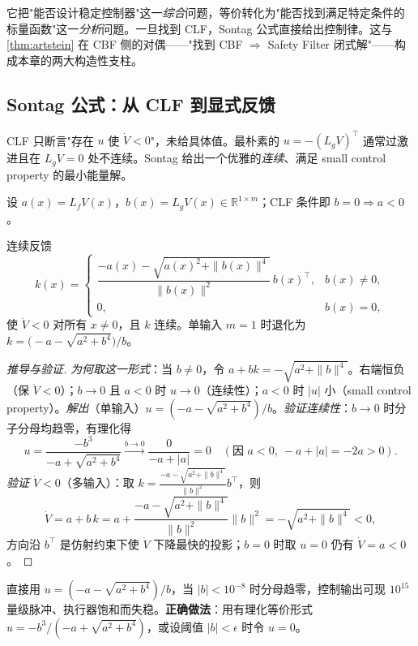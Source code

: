 \begin{insight}
它把"能否设计稳定控制器"这一\emph{综合}问题，等价转化为"能否找到满足特定条件的标量函数"这一\emph{分析}问题。一旦找到 CLF，Sontag 公式直接给出控制律。这与 \cref{thm:artstein} 在 CBF 侧的对偶——"找到 CBF $\Rightarrow$ Safety Filter 闭式解"——构成本章的两大构造性支柱。
\end{insight}

\subsection{Sontag 公式：从 CLF 到显式反馈}
\label{sec:sontag}

CLF 只断言"存在 $u$ 使 $\dot V<0$"，未给具体值。最朴素的 $u=-(L_gV)^\top$ 通常过激进且在 $L_gV=0$ 处不连续。Sontag 给出一个优雅的\emph{连续}、满足 small control property 的最小能量解。

设 $a(x)=L_fV(x)$，$b(x)=L_gV(x)\in\mathbb R^{1\times m}$；CLF 条件即 $b=0\Rightarrow a<0$。

\begin{theorem}\label{thm:sontag}
连续反馈
\begin{equation}
k(x)=\begin{cases}\dfrac{-a(x)-\sqrt{a(x)^2+\|b(x)\|^4}}{\|b(x)\|^2}\,b(x)^\top,& b(x)\neq0,\\[6pt]0,& b(x)=0,\end{cases}
\label{eq:sontag}
\end{equation}
使 $\dot V<0$ 对所有 $x\neq0$，且 $k$ 连续。单输入 $m=1$ 时退化为 $k=\big(-a-\sqrt{a^2+b^4}\big)/b$。
\end{theorem}

\begin{proof}[推导与验证]
\emph{为何取这一形式}：当 $b\neq0$，令 $a+bk=-\sqrt{a^2+\|b\|^4}$。右端恒负（保 $\dot V<0$）；$b\to0$ 且 $a<0$ 时 $u\to0$（连续性）；$a<0$ 时 $|u|$ 小（small control property）。\emph{解出}（单输入）$u=(-a-\sqrt{a^2+b^4})/b$。\emph{验证连续性}：$b\to0$ 时分子分母均趋零，有理化得
\[
u=\frac{-b^3}{-a+\sqrt{a^2+b^4}}\xrightarrow{b\to0}\frac{0}{-a+|a|}=0\quad(\text{因 }a<0,\ -a+|a|=-2a>0).
\]
\emph{验证 $\dot V<0$}（多输入）：取 $k=\frac{-a-\sqrt{a^2+\|b\|^4}}{\|b\|^2}b^\top$，则
\[
\dot V=a+b\,k=a+\frac{-a-\sqrt{a^2+\|b\|^4}}{\|b\|^2}\|b\|^2=-\sqrt{a^2+\|b\|^4}<0,
\]
方向沿 $b^\top$ 是仿射约束下使 $\dot V$ 下降最快的投影；$b=0$ 时取 $u=0$ 仍有 $\dot V=a<0$。
\end{proof}

\begin{pitfall}
直接用 $u=(-a-\sqrt{a^2+b^4})/b$，当 $|b|<10^{-8}$ 时分母趋零，控制输出可现 $10^{15}$ 量级脉冲、执行器饱和而失稳。\textbf{正确做法}：用有理化等价形式 $u=-b^3/(-a+\sqrt{a^2+b^4})$，或设阈值 $|b|<\epsilon$ 时令 $u=0$。
\end{pitfall}

